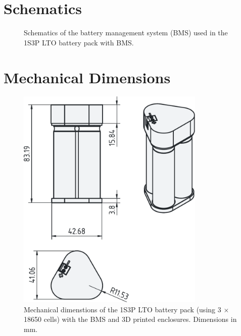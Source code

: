 \documentclass[11pt]{datasheet}
\begin{document}
\clearpage
\section{Schematics}

\begin{figure}[!ht]
    \centering
    \caption{Schematics of the battery management system (BMS) used in the 1S3P LTO battery pack with BMS.}
\end{figure}

\clearpage
\section{Mechanical Dimensions}

\begin{figure}[!ht]
    \centerline{%
        \includegraphics[width=0.8\textwidth]{../docs/LTO-BMS-revB-dimensions.pdf}
    }
    \caption{Mechanical dimenstions of the 1S3P LTO battery pack (using 3 $\times$ 18650 cells) with the BMS and 3D printed enclosures. Dimensions in mm.}
\end{figure}
\end{document}
